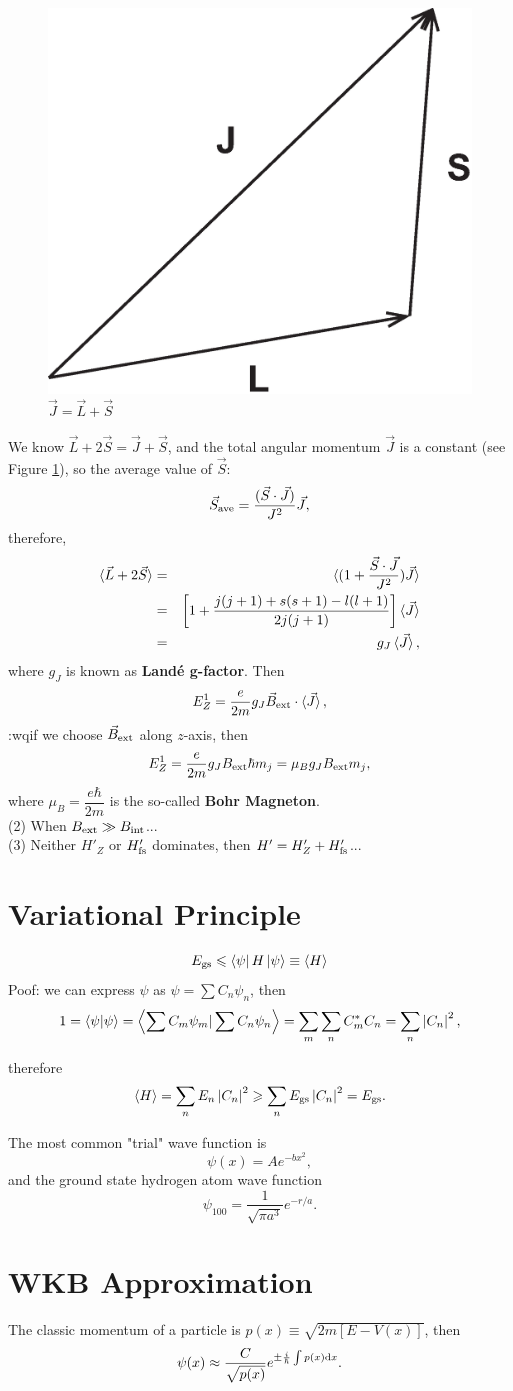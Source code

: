 \documentclass[12pt, 
]{article}
\begin{document}
\begin{figure}
\centering
\includegraphics[width=.4\textwidth]{fig1.eps}
\vspace{-1cm}
\caption{$\vec{J}=\vec{L}+\vec{S}$}
\label{fg:1}
\end{figure}

We know $\vec{L}+2\vec{S}=\vec{J}+\vec{S}$, and the total angular momentum $\vec{J}$ is a constant (see Figure \ref{fg:1}), so the average value of $\vec{S}$:
\[
	\vec{S}_{\rm ave}=\frac{(\vec{S}\cdot\vec{J})}{J^2}\vec{J},
\]
therefore,
\begin{eqnarray*}
	\braket{\vec{L}+2\vec{S}}&=&\braket{(1+\frac{\vec{S}\cdot\vec{J}}{J^2})\vec{J}}\\
	&=&\left[1+\frac{j(j+1)+s(s+1)-l(l+1)}{2j(j+1)}\right]\braket{\vec{J}}\\
	&=&g_J\braket{\vec{J}},
\end{eqnarray*}
where $g_J$ is known as {\bf Land\'{e} g-factor}.
Then
\[
	E^1_Z=\frac{e}{2m}g_J\vec{B}_{\rm ext}\cdot\braket{\vec{J}},
\]
:wqif we choose $\vec{B}_{\rm ext}$ along $z$-axis, then
\[
	E_Z^1=\frac{e}{2m}g_JB_{\rm ext}\hbar m_j=\mu_B g_JB_{\rm ext}m_j,
\]
where $\mu_B=\dfrac{e\hbar}{2m}$ is the so-called {\bf Bohr Magneton}.\\

\noindent (2) When $B_{\rm ext}\gg B_{\rm int}$...\\

\noindent (3) Neither $H'_Z$ or $H'_{\rm fs}$ dominates, then $H'=H'_Z+H'_{\rm fs}$...
\newpage

\section{Variational Principle}
\[	
	E_{\rm gs}\leqslant\bra{\psi}H\ket{\psi}\equiv\braket{H}
\]
Poof: we can express $\psi$ as $\psi=\sum C_n\psi_n$, then
\[
	1=\braket{\psi|\psi}=\left<\sum C_m\psi_m|\sum C_n\psi_n\right>=\sum_m\sum_n C_m^*C_n=\sum_n\left|C_n\right|^2,
\]

therefore
\[
	\braket{H}=\sum_nE_n\left|C_n\right|^2\geqslant\sum_nE_{\rm gs}\left|C_n\right|^2=E_{\rm gs}.
\]

The most common "trial" wave function is
\[
	\psi(x)=Ae^{-bx^2},
\]
and the ground state hydrogen atom wave function
\[
	\psi_{100}=\frac{1}{\sqrt{\pi a^3}}e^{-r/a}.
\]

\section{WKB Approximation}
The classic momentum of a particle is $p(x)\equiv\sqrt{2m[E-V(x)]}$, then
\[
	\psi(x)\approx\frac{C}{\sqrt{p(x)}}e^{\pm\frac{i}{\hbar}\int p(x){\rm d}x}.
\]
\end{document}
